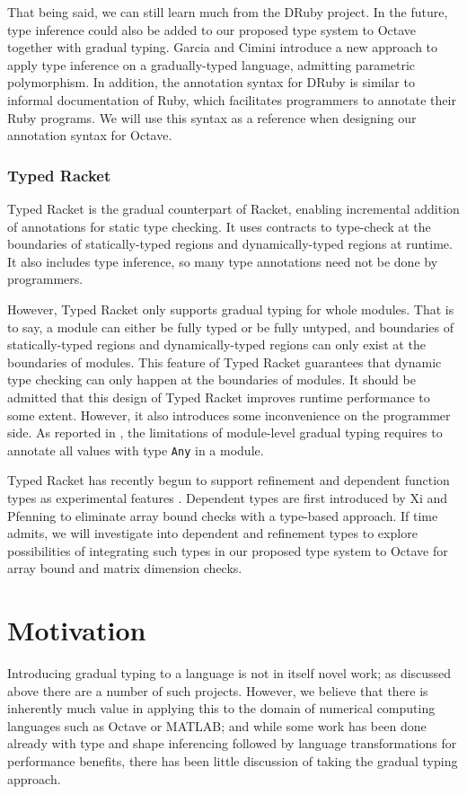 That being said, we can still learn much from the DRuby project. In the future, type inference could also be added to our proposed type system to Octave together with gradual typing. Garcia and Cimini \cite{garcia2015principal} introduce a new approach to apply type inference on a gradually-typed language, admitting parametric polymorphism. In addition, the annotation syntax for DRuby is similar to informal documentation of Ruby, which facilitates programmers to annotate their Ruby programs. We will use this syntax as a reference when designing our annotation syntax for Octave.

\subsubsection{Typed Racket \cite{tobin2006interlanguage}}
Typed Racket is the gradual counterpart of Racket, enabling incremental addition of annotations for static type checking. It uses contracts to type-check at the boundaries of statically-typed regions and dynamically-typed regions at runtime. It also includes type inference, so many type annotations need not be done by programmers.

However, Typed Racket only supports gradual typing for whole modules. That is to say, a module can either be fully typed or be fully untyped, and boundaries of statically-typed regions and dynamically-typed regions can only exist at the boundaries of modules. This feature of Typed Racket guarantees that dynamic type checking can only happen at the boundaries of modules. It should be admitted that this design of Typed Racket improves runtime performance to some extent. However, it also introduces some inconvenience on the programmer side. As reported in \cite{figueroa2012practical}, the limitations of module-level gradual typing requires to annotate all values with type {\tt Any} in a module.

Typed Racket has recently begun to support refinement and dependent function types as experimental features \cite{kent2017refinement}. Dependent types are first introduced by Xi and Pfenning \cite{xi1998eliminating} to eliminate array bound checks with a type-based approach. If time admits, we will investigate into dependent and refinement types to explore possibilities of integrating such types in our proposed type system to Octave for array bound and matrix dimension checks.


\section{Motivation}
Introducing gradual typing to a language is not in itself novel work; as discussed above there are a number of such projects. However, we believe that there is inherently much value in applying this to the domain of numerical computing languages such as Octave or MATLAB; and while some work has been done already with type and shape inferencing followed by language transformations for performance benefits, there has been little discussion of taking the gradual typing approach.

